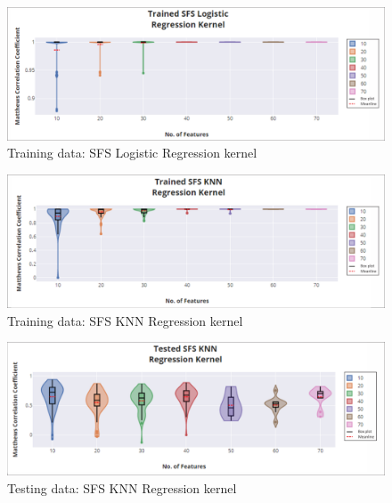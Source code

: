 \documentclass[a4paper,twocolumn]{article} %
\begin{document}
		\begin{figure}[h]
		\begin{center}
			\includegraphics[width=500pt]{Trained_SFS_Logistic_Regression_Kernel.PNG}
			\caption{Training data: SFS Logistic Regression kernel}
			\label{fig:Train_SFS_Logistic}
		\end{center}
	\end{figure}
	
		
		\begin{figure}[h]
		\begin{center}
			\includegraphics[width=500pt]{Trained_SFS_KNN_Regression_Kernel.PNG}
			\caption{Training data: SFS KNN Regression kernel}
			\label{fig:Train_SFS_KNN}
		\end{center}
	\end{figure}
	
	
		\begin{figure}[h]
		\begin{center}
			\includegraphics[width=500pt]{Tested_SFS_KNN_Regression_Kernel.PNG}
			\caption{Testing data: SFS KNN Regression kernel}
			\label{fig:Test_SFS_KNN}
		\end{center}
	\end{figure}
	
\end{document}
